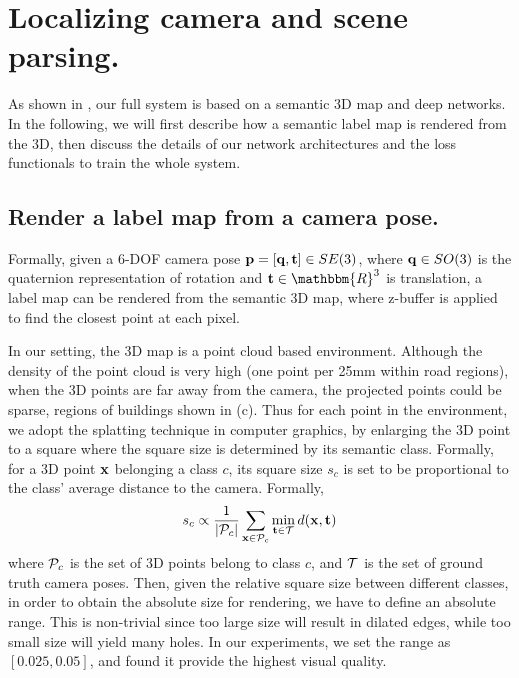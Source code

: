 
\vspace{-0.5\baselineskip}
\section{Localizing camera and scene parsing.}
\vspace{-0.3\baselineskip}
\label{sec:localize_and_parsing}
As shown in , our full system is based on a semantic 3D map and deep networks. In the following, we will first describe how a semantic label map is rendered from the 3D, then discuss the details of our network architectures and the loss functionals to train the whole system.

\subsection{Render a label map from a camera pose.}
\label{sub:render}
Formally, given a 6-DOF camera pose ${\mathbf p} = [{\mathbf q}, {\mathbf t}] \in SE(3)$, where ${\mathbf q} \in SO(3)$ is the quaternion representation of rotation and $\ve{t} \in \mathbbm{R}^3$ is translation, a label map can be rendered from the semantic 3D map, where z-buffer is applied to find the closest point at each pixel.

In our setting, the 3D map is a point cloud based environment. Although the density of the point cloud is very high (one point per 25mm within road regions), when the 3D points are far away from the camera, the projected points could be sparse, \eg regions of buildings shown in (c).
Thus for each point in the environment, we adopt the splatting technique in computer graphics, by enlarging the 3D point to a square where the square size is determined by its semantic class. Formally, for a 3D point ${\mathbf x}$ belonging a class $c$, its square size $s_c$ is set to be proportional to the class' average distance to the camera. Formally,
{\vspace{-0.3\baselineskip}
\begin{align}
\label{eq:square_size}
s_c \propto \frac{1}{|{\mathcal P}_c|}\sum_{{\mathbf x}\in {\mathcal P}_c} \min_{{\mathbf t}\in{\mathcal T}} d({\mathbf x}, {\mathbf t})
\end{align}
}
where ${\mathcal P}_c$ is the set of 3D points belong to class $c$, and ${\mathcal T}$ is the set of ground truth camera poses. Then, given the relative square size between different classes, in order to obtain the absolute size for rendering, we have to define an absolute range. This is non-trivial since too large size will result in dilated edges, while too small size will yield many holes. In our experiments, we set the range as $[0.025, 0.05]$, and found it provide the highest visual quality.

